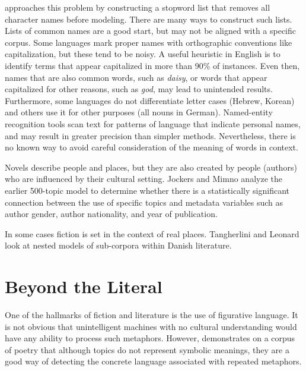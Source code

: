\cite{jockers-13} approaches this problem by constructing a stopword list that removes all character names before modeling.
There are many ways to construct such lists.
Lists of common names are a good start, but may not be aligned with a specific corpus.
Some languages mark proper names with orthographic conventions like capitalization, but these tend to be noisy.
A useful heuristic in English is to identify terms that appear capitalized in more than 90\% of instances.
Even then, names that are also common words, such as {\em daisy}, or words that appear capitalized for other reasons, such as {\em god}, may lead to unintended results.
Furthermore, some languages do not differentiate letter cases (Hebrew, Korean) and others use it for other purposes (all nouns in German).
Named-entity recognition tools scan text for patterns of language that indicate personal names, and may result in greater precision than simpler methods.
Nevertheless, there is no known way to avoid careful consideration of the meaning of words in context.

Novels describe people and places, but they are also created by people (authors) who are influenced by their cultural setting.
Jockers and Mimno \citep{jockers-13b} analyze the earlier 500-topic model to determine whether there is a statistically significant connection between the use of specific topics and metadata variables such as author gender, author nationality, and year of publication.

In some cases fiction is set in the context of real places.
Tangherlini and Leonard \citep{tangherlini-13} look at nested models of sub-corpora within Danish literature.

\section{Beyond the Literal}

One of the hallmarks of fiction and literature is the use of figurative language.
It is not obvious that unintelligent machines with no cultural understanding would have any ability to process such metaphors. However, \cite{rhody-12} demonstrates on a corpus of poetry that although topics do not represent symbolic meanings, they are a good way of detecting the concrete language associated with repeated metaphors.

